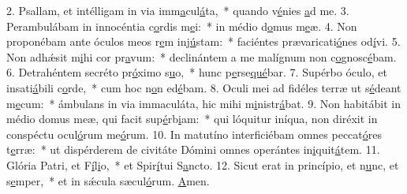 2. Psallam, et intélligam in via imm\uline{a}cul\uline{á}ta,~* quando v\uline{é}nies \uline{a}d me.
3. Perambulábam in innocéntia c\uline{o}rdis m\uline{e}i:~* in médio d\uline{o}mus m\uline{e}æ.
4. Non proponébam ante óculos meos r\uline{e}m inj\uline{ú}stam:~* faciéntes prævaricati\uline{ó}nes od\uline{í}vi.
5. Non adhǽsit m\uline{i}hi cor pr\uline{a}vum:~* declinántem a me malígnum non c\uline{o}gnosc\uline{é}bam.
6. Detrahéntem secréto pr\uline{ó}ximo s\uline{u}o,~* hunc p\uline{e}rse\uline{qué}bar.
7. Supérbo óculo, et insati\uline{á}bili c\uline{o}rde,~* cum hoc n\uline{o}n ed\uline{é}bam.
8. Oculi mei ad fidéles terræ ut s\uline{é}deant m\uline{e}cum:~* ámbulans in via immaculáta, hic mihi m\uline{i}nistr\uline{á}bat.
9. Non habitábit in médio domus meæ, qui facit sup\uline{é}rb\uline{i}am:~* qui lóquitur iníqua, non diréxit in conspéctu ocul\uline{ó}rum me\uline{ó}rum.
10. In matutíno interficiébam omnes peccat\uline{ó}res t\uline{e}rræ:~* ut dispérderem de civitáte Dómini omnes operántes in\uline{i}quit\uline{á}tem.
11. Glória Patri, et F\uline{í}l\uline{i}o,~* et Spir\uline{í}tui S\uline{a}ncto.
12. Sicut erat in princípio, et n\uline{u}nc, et s\uline{e}mper,~* et in sǽcula sæcul\uline{ó}rum. \uline{A}men.
